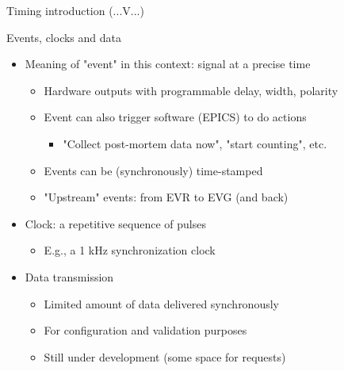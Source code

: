 \documentclass[
  9pt
  , table
  , ignorenonframetext
]{beamer}
\begin{document}
\begin{frame}{Timing introduction (...V...)}
  \begin{block}{Events, clocks and data}
    \begin{itemize}
      \item Meaning of "event" in this context: signal at a precise time
      \begin{itemize}
        \item Hardware outputs with programmable delay, width, polarity
        \item Event can also trigger software (EPICS) to do actions
        \begin{itemize}
          \item "Collect post-mortem data now", "start counting", etc.
        \end{itemize}
        \item Events can be (synchronously) time-stamped
        \item "Upstream" events: from EVR to EVG (and back)
      \end{itemize}
      \item Clock: a repetitive sequence of pulses
      \begin{itemize}
        \item E.g., a 1 kHz synchronization clock
      \end{itemize}
      \item Data transmission
      \begin{itemize}
        \item Limited amount of data delivered synchronously
        \item For configuration and validation purposes
        \item Still under development (some space for requests)
      \end{itemize}
    \end{itemize}
  \end{block}
\end{frame}
\end{document}
